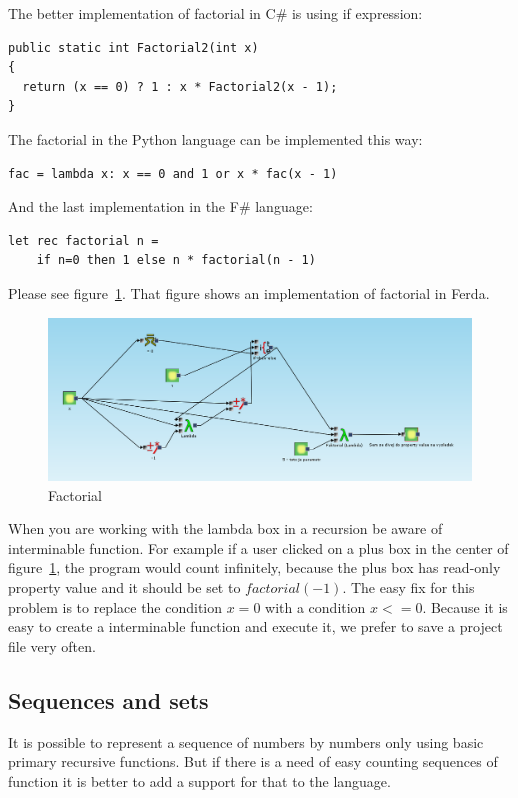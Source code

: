 \documentclass[a4paper,12pt]{book}
\begin{document}
The better implementation of factorial in C\# is using if expression:
\begin{verbatim}
public static int Factorial2(int x)
{
  return (x == 0) ? 1 : x * Factorial2(x - 1);
}
\end{verbatim}

The factorial in the Python language can be implemented this way:
\begin{verbatim}
fac = lambda x: x == 0 and 1 or x * fac(x - 1)
\end{verbatim}

And the last implementation in the F\# language:
\begin{verbatim}
let rec factorial n =
    if n=0 then 1 else n * factorial(n - 1)
\end{verbatim}

Please see figure~\ref{fig:factorial}. That figure shows an implementation of factorial in Ferda.
\begin{figure}
	\includegraphics[width=1\textwidth]{faktorial}
	\caption{Factorial}
	\label{fig:factorial}
\end{figure}

When you are working with the lambda box in a recursion be aware of interminable function. For example if a user clicked on a plus box in the center of figure~\ref{fig:factorial}, the program would count infinitely, because the plus box has read-only property value and it should be set to $factorial(-1)$. The easy fix for this problem is to replace the condition $x=0$ with a condition $x<=0$. Because it is easy to create a interminable function and execute it, we prefer to save a project file very often.

\subsection{Sequences and sets}
\label{sec:sequences}
It is possible to represent a sequence of numbers by numbers only using basic primary recursive functions. But if there is a need of easy counting sequences of function it is better to add a support for that to the language.
\end{document}
